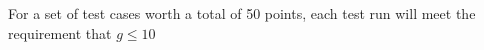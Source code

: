 For a set of test cases worth a total of 50 points, each test run will meet the requirement that $g \le 10$
